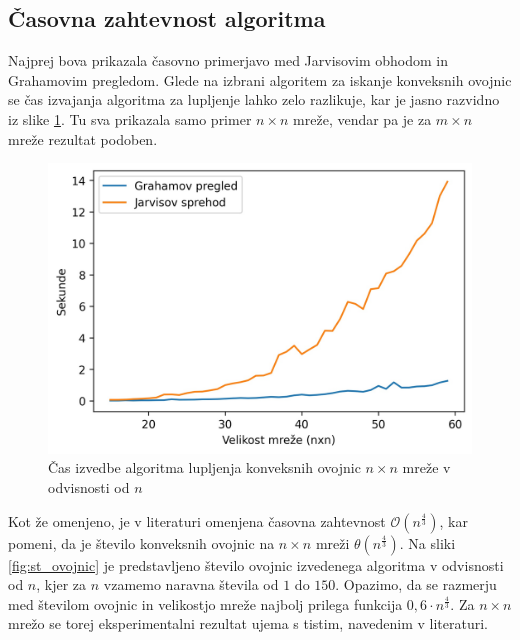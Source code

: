 \documentclass[a4paper]{article}
\begin{document}
\subsection{Časovna zahtevnost algoritma}
Najprej bova prikazala časovno primerjavo med Jarvisovim obhodom in Grahamovim pregledom. Glede na izbrani algoritem za iskanje konveksnih ovojnic se čas izvajanja algoritma za lupljenje
lahko zelo razlikuje, kar je jasno razvidno iz slike \ref{fig:cas}. Tu sva prikazala samo primer $n \times n$ mreže, vendar pa je za $m \times n$ mreže rezultat podoben.

\begin{figure}[!h]
	\centering
	\caption{Čas izvedbe algoritma lupljenja konveksnih ovojnic $n \times n$ mreže v odvisnosti od $n$}
	\label{fig:cas}
	\vspace{2mm}
	\includegraphics[scale=0.6]{cas.jpg}
\end{figure}

Kot že omenjeno, je v literaturi omenjena časovna zahtevnost $\mathcal{O}(n ^ \frac{4}{3})$, kar pomeni, da je število konveksnih ovojnic na $n \times n$ mreži $\theta(n ^ \frac{4}{3})$.
Na sliki \ref{fig:st_ovojnic} je predstavljeno število ovojnic izvedenega algoritma v odvisnosti od $n$, kjer za $n$ vzamemo naravna števila od $1$ do $150$. Opazimo, da se razmerju med 
številom ovojnic in velikostjo mreže najbolj prilega funkcija $0,6 \cdot n ^ \frac{4}{3}$. Za $n \times n$ mrežo se torej eksperimentalni rezultat ujema s tistim, navedenim v literaturi.
\end{document}
